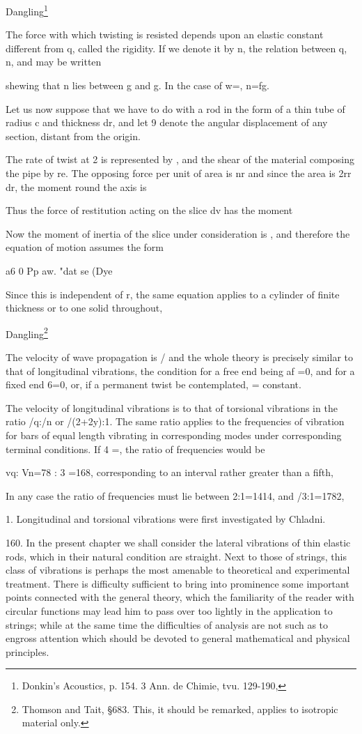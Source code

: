 Dangling\footnote{ Donkin's Acoustics, p. 154. 3 Ann. de Chimie, tvu. 129-190,}

The force with which twisting is resisted depends upon an elastic
constant different from q, called the rigidity. If we denote it by n,
the relation between q, n, and may be written

shewing that n lies between g and g. In the case of w=, n=fg.

Let us now suppose that we have to do with a rod in the form of a thin
tube of radius c and thickness dr, and let 9 denote the angular
displacement of any section, distant from the origin.

The rate of twist at 2 is represented by , and the shear of the material
composing the pipe by re. The opposing force per
unit of area is nr and since the area is 2rr dr, the moment
round the axis is

Thus the force of restitution acting on the slice dv has the moment

Now the moment of inertia of the slice under consideration is , and
therefore the equation of motion assumes the form

a6 0 Pp aw. "dat se (Dye

Since this is independent of r, the same equation applies to a cylinder
of finite thickness or to one solid throughout,

Dangling\footnote{ Thomson and Tait, \S 683. This, it should be remarked, applies to
isotropic material only.}

The velocity of wave propagation is / and the whole theory is precisely
similar to that of longitudinal vibrations, the condition
for a free end being af =0, and for a fixed end 6=0, or, if a permanent
twist be contemplated, = constant.

The velocity of longitudinal vibrations is to that of torsional
vibrations in the ratio /q:/n or /(2+2y):1. The same ratio applies to
the frequencies of vibration for bars of equal length vibrating in
corresponding modes under corresponding terminal conditions. If 4 =, the
ratio of frequencies would be

vq: Vn=78 : 3 =168, corresponding to an interval rather greater than a
fifth,

In any case the ratio of frequencies must lie between 2:1=1414, and
/3:1=1782,

1. Longitudinal and torsional vibrations were first investigated by
Chladni.

160. In the present chapter we shall consider the lateral vibrations of
thin elastic rods, which in their natural condition are straight. Next
to those of strings, this class of vibrations is perhaps the most
amenable to theoretical and experimental treatment. There is difficulty
sufficient to bring into prominence some important points connected with
the general theory, which the familiarity of the reader with circular
functions may lead him to pass over too lightly in the application to
strings; while at the same time the difficulties of analysis are not
such as to engross attention which should be devoted to general
mathematical and physical principles.

